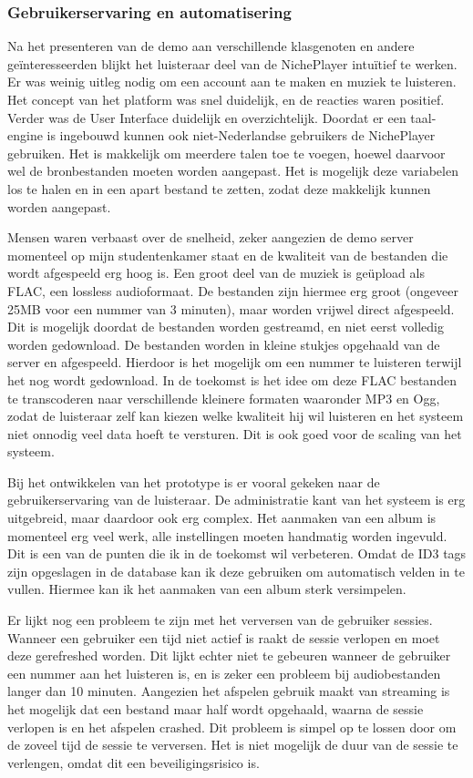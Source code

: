 \subsubsection*{Gebruikerservaring en automatisering}
Na het presenteren van de demo aan verschillende klasgenoten en andere geïnteresseerden blijkt het luisteraar deel van de NichePlayer intuïtief te werken. Er was weinig uitleg nodig om een account aan te maken en muziek te luisteren. Het concept van het platform was snel duidelijk, en de reacties waren positief. Verder was de User Interface duidelijk en overzichtelijk. Doordat er een taal-engine is ingebouwd kunnen ook niet-Nederlandse gebruikers de NichePlayer gebruiken. Het is makkelijk om meerdere talen toe te voegen, hoewel daarvoor wel de bronbestanden moeten worden aangepast. Het is mogelijk deze variabelen los te halen en in een apart bestand te zetten, zodat deze makkelijk kunnen worden aangepast.

Mensen waren verbaast over de snelheid, zeker aangezien de demo server momenteel op mijn studentenkamer staat en de kwaliteit van de bestanden die wordt afgespeeld erg hoog is. Een groot deel van de muziek is geüpload als FLAC, een lossless audioformaat. De bestanden zijn hiermee erg groot (ongeveer 25MB voor een nummer van 3 minuten), maar worden vrijwel direct afgespeeld. Dit is mogelijk doordat de bestanden worden gestreamd, en niet eerst volledig worden gedownload. De bestanden worden in kleine stukjes opgehaald van de server en afgespeeld. Hierdoor is het mogelijk om een nummer te luisteren terwijl het nog wordt gedownload. In de toekomst is het idee om deze FLAC bestanden te transcoderen naar verschillende kleinere formaten waaronder MP3 en Ogg, zodat de luisteraar zelf kan kiezen welke kwaliteit hij wil luisteren en het systeem niet onnodig veel data hoeft te versturen. Dit is ook goed voor de scaling van het systeem.

Bij het ontwikkelen van het prototype is er vooral gekeken naar de gebruikerservaring van de luisteraar. De administratie kant van het systeem is erg uitgebreid, maar daardoor ook erg complex. Het aanmaken van een album is momenteel erg veel werk, alle instellingen moeten handmatig worden ingevuld. Dit is een van de punten die ik in de toekomst wil verbeteren. Omdat de ID3 tags zijn opgeslagen in de database kan ik deze gebruiken om automatisch velden in te vullen. Hiermee kan ik het aanmaken van een album sterk versimpelen.

Er lijkt nog een probleem te zijn met het verversen van de gebruiker sessies. Wanneer een gebruiker een tijd niet actief is raakt de sessie verlopen en moet deze gerefreshed worden. Dit lijkt echter niet te gebeuren wanneer de gebruiker een nummer aan het luisteren is, en is zeker een probleem bij audiobestanden langer dan 10 minuten. Aangezien het afspelen gebruik maakt van streaming is het mogelijk dat een bestand maar half wordt opgehaald, waarna de sessie verlopen is en het afspelen crashed. Dit probleem is simpel op te lossen door om de zoveel tijd de sessie te verversen. Het is niet mogelijk de duur van de sessie te verlengen, omdat dit een beveiligingsrisico is.

